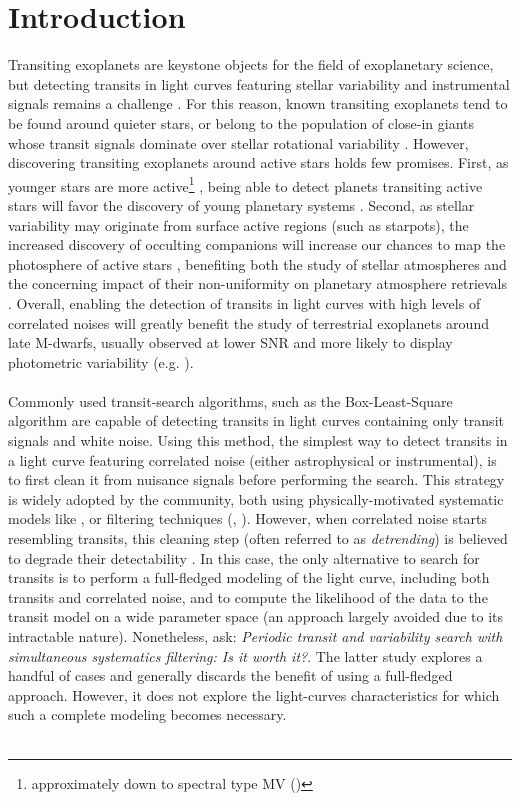 \documentclass[modern]{aastex631}
\begin{document}
\section*{Introduction}
Transiting exoplanets are keystone objects for the field of exoplanetary science, but detecting transits in light curves featuring stellar variability and instrumental signals remains a challenge \citep{Pont2006,Howell2016}. For this reason, known transiting exoplanets tend to be found around quieter stars, or belong to the population of close-in giants whose transit signals dominate over stellar rotational variability \citep{Simpson2023}. However, discovering transiting exoplanets around active stars holds few promises. First, as younger stars are more active\footnote{approximately down to spectral type MV ()} \citep{Skumanich1972}, being able to detect planets transiting active stars will favor the discovery of young planetary systems \citep[e.g.][]{Newton2022}. Second, as stellar variability may originate from surface active regions (such as starpots), the increased discovery of occulting companions will increase our chances to map the photosphere of active stars \citep[e.g.][]{Morris2017}, benefiting both the study of stellar atmospheres and the concerning impact of their non-uniformity on planetary atmosphere retrievals \citep{rackham2018}. Overall, enabling the detection of transits in light curves with high levels of correlated noises will greatly benefit the study of terrestrial exoplanets around late M-dwarfs, usually observed at lower SNR and more likely to display photometric variability (e.g. \citealt{Murray2020}).
\\\\
Commonly used transit-search algorithms, such as the Box-Least-Square algorithm \citep[BLS,][]{bls} are capable of detecting transits in light curves containing only transit signals and white noise. Using this method, the simplest way to detect transits in a light curve featuring correlated noise (either astrophysical or instrumental), is to first clean it from nuisance signals before performing the search. This strategy is widely adopted by the community, both using physically-motivated systematic models like \cite{everest1, everest2}, or filtering techniques (\citealt{Jenkins2010}, \citealt{wotan}). However, when correlated noise starts resembling transits, this cleaning step (often referred to as \textit{detrending}) is believed to degrade their detectability \cite[see subsection 4.3 of][]{wotan}. In this case, the only alternative to search for transits is to perform a full-fledged modeling of the light curve, including both transits and correlated noise, and to compute the likelihood of the data to the transit model on a wide parameter space (an approach largely avoided due to its intractable nature). Nonetheless, \cite{kovacs2016} ask: \textit{Periodic transit and variability search with simultaneous systematics filtering: Is it worth it?}. The latter study explores a handful of cases and generally discards the benefit of using a full-fledged approach. However, it does not explore the light-curves characteristics for which such a complete modeling becomes necessary.\\\\
\end{document}
